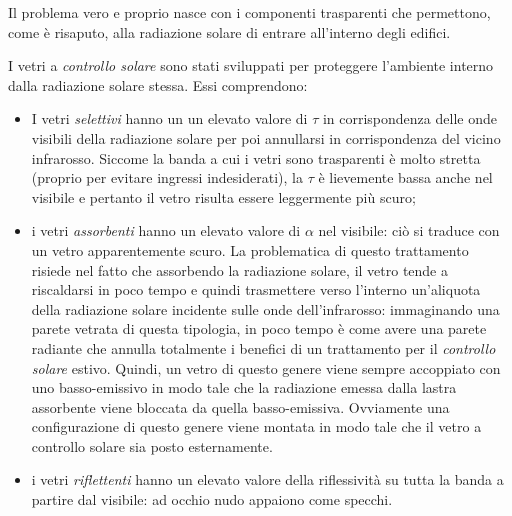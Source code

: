 Il problema vero e proprio nasce con i componenti trasparenti che permettono, come è risaputo, alla radiazione solare di entrare all'interno degli edifici.

I vetri a \emph{controllo solare} sono stati sviluppati per proteggere l'ambiente interno dalla radiazione solare stessa. Essi comprendono:
\begin{itemize}
	\item I vetri \emph{selettivi} hanno un un elevato valore di $\tau$ in corrispondenza delle onde visibili della radiazione solare per poi annullarsi in corrispondenza del vicino infrarosso. Siccome la banda a cui i vetri sono trasparenti è molto stretta (proprio per evitare ingressi indesiderati), la $\tau$ è lievemente bassa anche nel visibile e pertanto il vetro risulta essere leggermente più scuro;
	\item i vetri \emph{assorbenti} hanno un elevato valore  di $\alpha$ nel visibile: ciò si traduce con un vetro apparentemente scuro. La problematica di questo trattamento risiede nel fatto che assorbendo la radiazione solare, il vetro tende a riscaldarsi in poco tempo e quindi trasmettere verso l'interno un'aliquota della radiazione solare incidente sulle onde dell'infrarosso: immaginando una parete vetrata di questa tipologia, in poco tempo è come avere una parete radiante che annulla totalmente i benefici di un trattamento per il \emph{controllo solare} estivo. Quindi, un vetro di questo genere viene sempre accoppiato con uno basso-emissivo in modo tale che la radiazione emessa dalla lastra assorbente viene bloccata da quella basso-emissiva. Ovviamente una configurazione di questo genere viene montata in modo tale che il vetro a controllo solare sia posto esternamente.
	\item i vetri \emph{riflettenti} hanno un elevato valore della riflessività su tutta la banda a partire dal visibile: ad occhio nudo appaiono come specchi.
\end{itemize}

